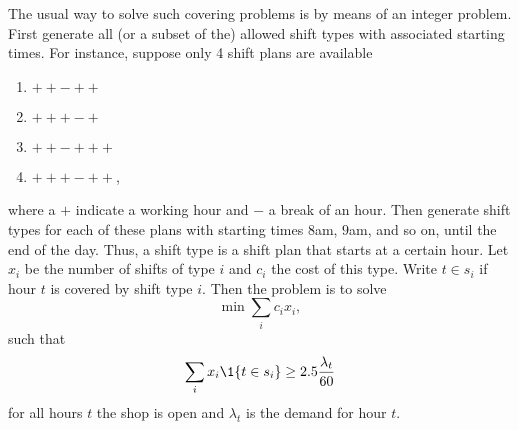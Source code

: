 The usual way to solve such  covering problems is by means of an integer
problem. First generate all (or a subset of the) allowed shift types
with associated starting times. For instance, suppose only 4 shift
plans are available
\begin{enumerate}
\item $++-++$
\item $+++-+$
\item $++-+++$
\item $+++-++$,
\end{enumerate}
where a $+$ indicate a working hour and $-$ a break of an hour. Then
generate shift types for each of these plans with starting times
$8$am, $9$am, and so on, until the end of the day. Thus, a shift type
is a shift plan that starts at a certain hour. Let $x_i$ be the number
of shifts of type $i$ and $c_i$ the cost of this type. Write $t\in s_i$ if
hour $t$ is covered by shift type $i$.  Then the problem is to solve
\begin{equation*}
  \min \sum_i c_i x_i,
\end{equation*}
such that 
\begin{equation*}
  \sum_i x_i \1{t \in s_i} \geq 2.5 \frac{\lambda_t}{60}
\end{equation*}
for all hours $t$ the shop is open and $\lambda_t$ is the demand for
hour $t$.








